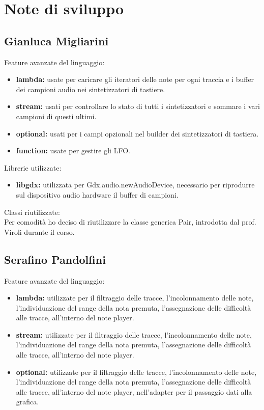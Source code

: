 \documentclass[a4paper,12pt]{report}
\begin{document}
\section{Note di sviluppo}
\subsection{Gianluca Migliarini}
Feature avanzate del linguaggio:
\begin{itemize}
	\item \textbf{lambda:} usate per caricare gli iteratori delle note per ogni traccia e i buffer dei campioni audio nei sintetizzatori di tastiere.
	\item \textbf{stream:} usati per controllare lo stato di tutti i sintetizzatori e sommare i vari campioni di questi ultimi.
	\item \textbf{optional:} usati per i campi opzionali nel builder dei sintetizzatori di tastiera. 
	\item \textbf{function:} usate per gestire gli LFO.
\end{itemize}
Librerie utilizzate:
\begin{itemize}
	\item \textbf{libgdx:} utilizzata per Gdx.audio.newAudioDevice, necessario per riprodurre sul dispositivo audio hardware il buffer di campioni.
\end{itemize}
Classi riutilizzate: \\
Per comodità ho deciso di riutilizzare la classe generica Pair, introdotta dal prof. Viroli durante il corso.
\newpage

\subsection{Serafino Pandolfini}
Feature avanzate del linguaggio:
\begin{itemize}
	\item \textbf{lambda:} utilizzate per il filtraggio delle tracce, l'incolonnamento delle note, l'individuazione del range della nota premuta, l'assegnazione delle difficoltà alle tracce, all'interno del note player.
	\item \textbf{stream:} utilizzate per il filtraggio delle tracce, l'incolonnamento delle note, l'individuazione del range della nota premuta, l'assegnazione delle difficoltà alle tracce, all'interno del note player.
	\item \textbf{optional:} utilizzate per il filtraggio delle tracce, l'incolonnamento delle note, l'individuazione del range della nota premuta, l'assegnazione delle difficoltà alle tracce, all'interno del note player, nell'adapter per il passaggio dati alla grafica.
\end{itemize}
\newpage
\end{document}
